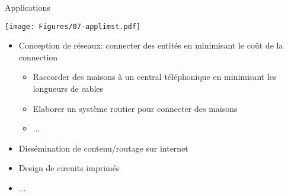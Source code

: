 \begin{frame}{Applications}

\centerline{\texttt{[image: Figures/07-applimst.pdf]}}

\bigskip

\begin{itemize}
\item Conception de réseaux: connecter des entités en minimisant le coût de la connection
\begin{itemize}
\item Raccorder des maisons à un central téléphonique en minimisant les longueurs de cables
\item Elaborer un système routier pour connecter des maisons
\item ...
\end{itemize}
\item Dissémination de contenu/routage sur internet
\item Design de circuits imprimés
\item ...
\end{itemize}

\end{frame}

